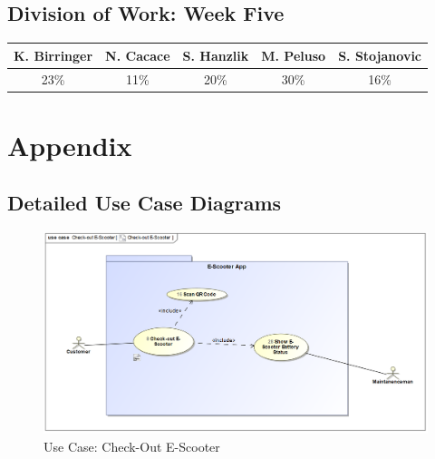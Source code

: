 \documentclass[a4paper, 12pt]{article}
\begin{document}
\subsection{Division of Work: Week Five}

\begin{table}[htbp]
\centering
\setlength{\tabcolsep}{10pt}
\begin{tabular}{|c|c|c|c|c|}
\hline
K. Birringer & N. Cacace & S. Hanzlik & M. Peluso & S. Stojanovic\\
\hline
23\%   &11\%  &20\%  &30\%  &16\%\\
\hline
\end{tabular}
\end{table}
\newpage
\section{Appendix}



\subsection{Detailed Use Case Diagrams}
\begin{figure} [htbp]
  \begin{center}
    \includegraphics[scale=0.52]{images/UseCases/Check-OutE-Scooter.png}
  \end{center}
  \caption{Use Case: Check-Out E-Scooter}
\end{figure}
\end{document}

